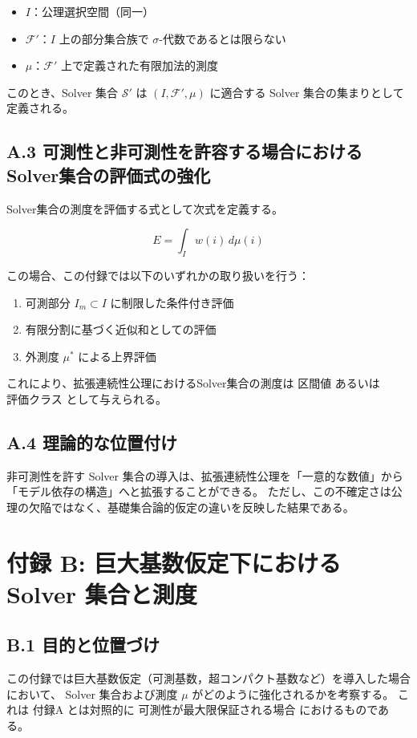 \documentclass[12pt,a4paper]{article}
\begin{document}
\begin{itemize}
  \item $I$：公理選択空間（同一）
  \item $\mathcal{F}'$：$I$ 上の部分集合族で $\sigma$-代数であるとは限らない
  \item $\mu$：$\mathcal{F}'$ 上で定義された有限加法的測度
\end{itemize}

このとき、Solver 集合 $\mathcal{S}'$ は $(I, \mathcal{F}', \mu)$ に適合する Solver 集合の集まりとして定義される。

\subsection{A.3 可測性と非可測性を許容する場合におけるSolver集合の評価式の強化}

Solver集合の測度を評価する式として次式を定義する。

\[
E = \int_I w(i)\, d\mu(i)
\]

この場合、この付録では以下のいずれかの取り扱いを行う： 

\begin{enumerate}
  \item 可測部分 $I_m \subset I$ に制限した条件付き評価
  \item 有限分割に基づく近似和としての評価
  \item 外測度 $\mu^*$ による上界評価
\end{enumerate}

これにより、拡張連続性公理におけるSolver集合の測度は $\textbf{区間値}$ あるいは $\textbf{評価クラス}$ として与えられる。

\subsection{A.4 理論的な位置付け}
非可測性を許す Solver 集合の導入は、拡張連続性公理を「一意的な数値」から 「モデル依存の構造」へと拡張することができる。
ただし、この不確定さは公理の欠陥ではなく、基礎集合論的仮定の違いを反映した結果である。

\section{付録 B: 巨大基数仮定下における Solver 集合と測度}

\subsection{B.1 目的と位置づけ}
この付録では巨大基数仮定（可測基数，超コンパクト基数など）を導入した場合において、 Solver 集合および測度 $\mu$ がどのように強化されるかを考察する。
これは 付録A とは対照的に $\textbf{可測性が最大限保証される場合}$ におけるものである。
\end{document}
